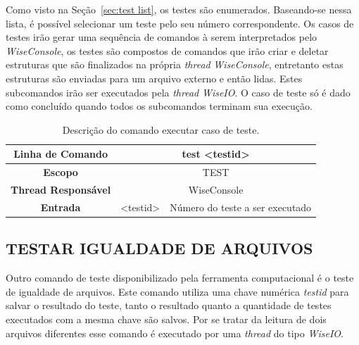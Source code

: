 Como visto na Seção~\ref{sec:test list}, os testes são enumerados. Baseando-se nessa lista, é possível selecionar um teste pelo seu número correspondente. Os casos de testes irão gerar uma sequência de comandos à serem interpretados pelo \textit{WiseConsole}, os testes são compostos de comandos que irão criar e deletar estruturas que são finalizados na própria \textit{thread} \textit{WiseConsole}, entretanto estas estruturas são enviadas para um arquivo externo e então lidas. Estes subcomandos irão ser executados pela \textit{thread} \textit{WiseIO}. O caso de teste só é dado como concluído quando todos os subcomandos terminam sua execução.

\begin{center}
	\begin{table}[!htbp]
		\begin{tabularx}{\textwidth}{c|c|X}
			\toprule
			\textbf{Linha de Comando} & \multicolumn{2}{c}{test <test\underline{\space}id>} \\
			\midrule
			\textbf{Escopo} & \multicolumn{2}{c}{TEST} \\
			\hline
			\textbf{Thread Responsável} & \multicolumn{2}{c}{WiseConsole} \\
			\hline
			\textbf{Entrada} & <test\underline{\space}id> & Número do teste a ser executado \\
			\bottomrule
		\end{tabularx}
		\caption{Descrição do comando executar caso de teste.}
		\label{tab:case_test}
	\end{table}
\end{center}

\subsection{TESTAR IGUALDADE DE ARQUIVOS}\label{sec:test_file}

Outro comando de teste disponibilizado pela ferramenta computacional é o teste de igualdade de arquivos. Este comando utiliza uma chave numérica \textit{test\underline{\space}id} para salvar o resultado do teste, tanto o resultado quanto a quantidade de testes executados com a mesma chave são salvos. Por se tratar da leitura de dois arquivos diferentes esse comando é executado por uma \textit{thread} do tipo \textit{WiseIO}.

